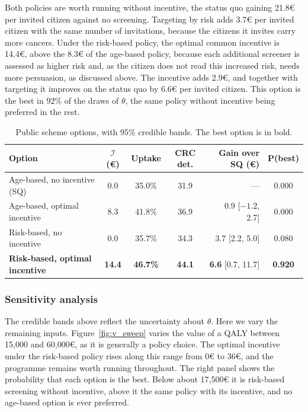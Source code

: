 \documentclass[12pt]{article}
\begin{document}
Both policies are worth running without incentive, the status quo gaining 21.8€ per invited citizen against no screening. Targeting by risk adds 3.7€ per invited citizen with the same number of invitations, because the citizens it invites carry more cancers. Under the risk-based policy, the optimal common incentive is 14.4€, above the 8.3€ of the age-based policy, because each additional screener is assessed as higher risk and, as the citizen does not read this increased risk, needs more persuasion, as discussed above. The incentive adds 2.9€, and together with targeting it improves on the status quo by 6.6€ per invited citizen. This option is the best in $92\%$ of the draws of $\theta$, the same policy without incentive being preferred in the rest.

\begin{table}[h!]
\centering
\footnotesize
\setlength{\tabcolsep}{4pt}
\caption{Public scheme options, with 95\% credible bands. The best option is in bold.}
\label{tab:public_results}
\begin{tabular}{l c c c r c}
\toprule
\textbf{Option} & $\mathcal{I}$ (€) & \textbf{Uptake} & \textbf{CRC det.} & \textbf{Gain over SQ (€)} & \textbf{P(best)} \\
\midrule
Age-based, no incentive (SQ)         & 0.0 & 35.0\% & 31.9 & --- & 0.000 \\
Age-based, optimal incentive         & 8.3 & 41.8\% & 36.9 & 0.9 [$-1.2$, 2.7] & 0.000 \\
Risk-based, no incentive             & 0.0 & 35.7\% & 34.3 & 3.7 [2.2, 5.0] & 0.080 \\
\textbf{Risk-based, optimal incentive} & \textbf{14.4} & \textbf{46.7\%} & \textbf{44.1} & \textbf{6.6} [0.7, 11.7] & \textbf{0.920} \\
\bottomrule
\end{tabular}
\end{table}


\subsubsection{Sensitivity analysis} \label{sec:public_sens_analysis}

The credible bands above reflect the uncertainty about $\theta$. Here we vary the remaining inputs. Figure~\ref{fig:v_sweep} varies the value of a QALY between 15{,}000 and 60{,}000€, as it is generally a policy choice. The optimal incentive under the risk-based policy rises along this range from 0€ to 36€, and the programme remains worth running throughout. The right panel shows the probability that each option is the best. Below about 17{,}500€ it is risk-based screening without incentive, above it the same policy with its incentive, and no age-based option is ever preferred.
\end{document}
